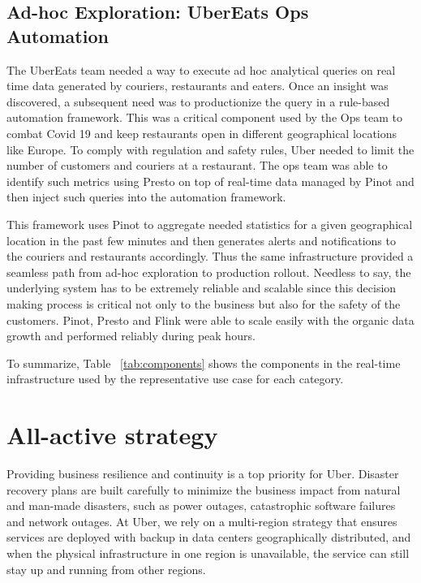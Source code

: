 \documentclass[sigconf]{acmart}
\begin{document}
\subsection{Ad-hoc Exploration: UberEats Ops Automation}

The UberEats team needed a way to execute ad hoc analytical queries on real time data generated by couriers, restaurants and eaters. Once an insight was discovered, a subsequent need was to productionize the query in a rule-based automation framework. This was a critical component used by the Ops team to combat Covid 19 and keep restaurants open in different geographical locations like Europe. To comply with regulation and safety rules, Uber needed to limit the number of customers and couriers at a restaurant. The ops team was able to identify such metrics using Presto on top of real-time data managed by Pinot and then inject such queries into the automation framework. 

This framework uses Pinot to aggregate needed statistics for a given geographical location in the past few minutes and then generates alerts and notifications to the couriers and restaurants accordingly. Thus the same infrastructure provided a seamless path from ad-hoc exploration to production rollout. Needless to say, the underlying system has to be extremely reliable and scalable since this decision making process is critical not only to the business but also for the safety of the customers. Pinot, Presto and Flink were able to scale easily with the organic data growth and performed reliably during peak hours. 

\bigskip

To summarize, Table ~\ref{tab:components} shows the components in the real-time infrastructure used by the representative use case for each category.

\section{All-active strategy} \label{sec:all-active}

Providing business resilience and continuity is a top priority for Uber. Disaster recovery plans are built carefully to minimize the business impact from natural and man-made disasters, such as power outages, catastrophic software failures and network outages. At Uber, we rely on a multi-region strategy that ensures services are deployed with backup in data centers geographically distributed, and when the physical infrastructure in one region is unavailable, the service can still stay up and running from other regions.
\end{document}
